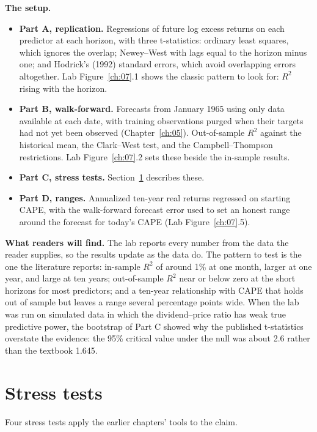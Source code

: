 \textbf{The setup.}

\begin{itemize}
  \item \textbf{Part A, replication.} Regressions of future log excess returns on each predictor at each horizon, with three t-statistics: ordinary least squares, which ignores the overlap; Newey--West with lags equal to the horizon minus one; and Hodrick's (1992) standard errors, which avoid overlapping errors altogether. Lab Figure~\ref{ch:07}.1 shows the classic pattern to look for: $R^2$ rising with the horizon.
  \item \textbf{Part B, walk-forward.} Forecasts from January 1965 using only data available at each date, with training observations purged when their targets had not yet been observed (Chapter~\ref{ch:05}). Out-of-sample $R^2$ against the historical mean, the Clark--West test, and the Campbell--Thompson restrictions. Lab Figure~\ref{ch:07}.2 sets these beside the in-sample results.
  \item \textbf{Part C, stress tests.} Section~\ref{sec:07-stress} describes these.
  \item \textbf{Part D, ranges.} Annualized ten-year real returns regressed on starting CAPE, with the walk-forward forecast error used to set an honest range around the forecast for today's CAPE (Lab Figure~\ref{ch:07}.5).
\end{itemize}

\textbf{What readers will find.} The lab reports every number from the data the reader supplies, so the results update as the data do. The pattern to test is the one the literature reports: in-sample $R^2$ of around 1\% at one month, larger at one year, and large at ten years; out-of-sample $R^2$ near or below zero at the short horizons for most predictors; and a ten-year relationship with CAPE that holds out of sample but leaves a range several percentage points wide. When the lab was run on simulated data in which the dividend--price ratio has weak true predictive power, the bootstrap of Part C showed why the published t-statistics overstate the evidence: the 95\% critical value under the null was about 2.6 rather than the textbook 1.645.

\section{Stress tests}
\label{sec:07-stress}

Four stress tests apply the earlier chapters' tools to the claim.

